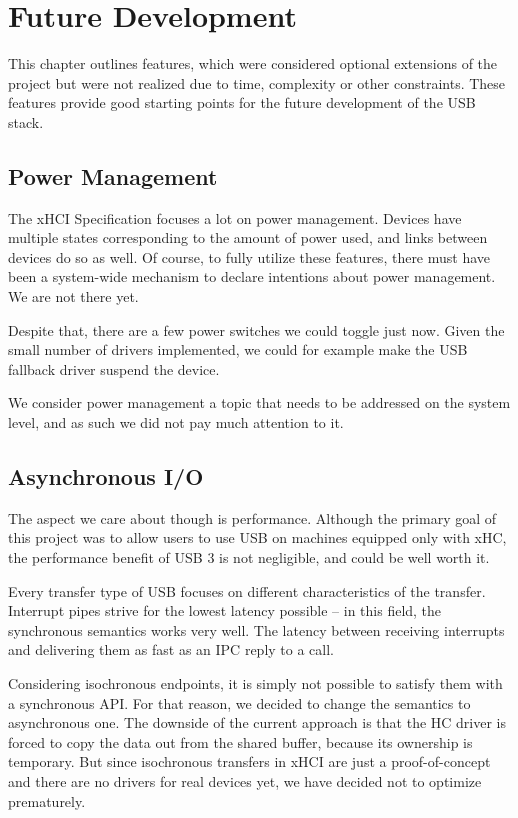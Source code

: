 \section{Future Development}

This chapter outlines features, which were considered optional extensions of
the project but were not realized due to time, complexity or other constraints.
These features provide good starting points for the future development of the
USB stack.

\subsection{Power Management}

The xHCI Specification focuses a lot on power management. Devices have multiple
states corresponding to the amount of power used, and links between devices
do so as well. Of course, to fully utilize these features, there must have been
a system-wide mechanism to declare intentions about power management. We are not
there yet.

Despite that, there are a few power switches we could toggle just now. Given the
small number of drivers implemented, we could for example make the USB fallback
driver suspend the device.

We consider power management a topic that needs to be addressed on the
system level, and as such we did not pay much attention to it.

\subsection{Asynchronous I/O}

The aspect we care about though is performance. Although the primary goal of
this project was to allow users to use USB on machines equipped only with xHC,
the performance benefit of USB 3 is not negligible, and could be well worth it.

Every transfer type of USB focuses on different characteristics of the
transfer. Interrupt pipes strive for the lowest latency possible -- in this
field, the synchronous semantics works very well. The latency between receiving
interrupts and delivering them as fast as an IPC reply to a call.

Considering isochronous endpoints, it is simply not possible to satisfy them
with a synchronous API. For that reason, we decided to change the semantics to asynchronous
one. The downside of the current approach is that the HC driver is forced to
copy the data out from the shared buffer, because its ownership is temporary.
But since isochronous transfers in xHCI are just a proof-of-concept and
there are no drivers for real devices yet, we have decided not to optimize
prematurely.

